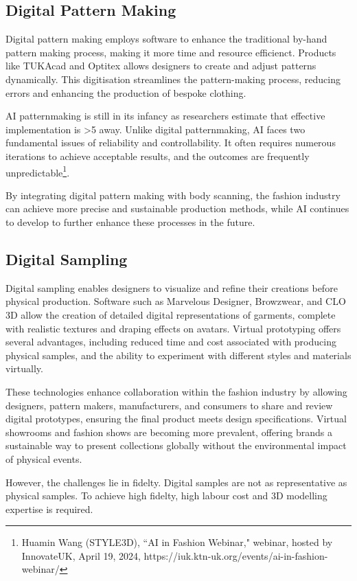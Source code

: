 \subsection{Digital Pattern Making}
Digital pattern making employs software to enhance the traditional by-hand pattern making process, making it more time and resource efficienct. Products like TUKAcad and Optitex allows designers to create and adjust patterns dynamically. This digitisation streamlines the pattern-making process, reducing errors and enhancing the production of bespoke clothing.

AI patternmaking is still in its infancy as researchers estimate that effective implementation is >5 away. Unlike digital patternmaking, AI faces two fundamental issues of reliability and controllability. It often requires numerous iterations to achieve acceptable results, and the outcomes are frequently unpredictable\footnote{Huamin Wang (STYLE3D), ``AI in Fashion Webinar," webinar, hosted by InnovateUK, April 19, 2024, https://iuk.ktn-uk.org/events/ai-in-fashion-webinar/}.

By integrating digital pattern making with body scanning, the fashion industry can achieve more precise and sustainable production methods, while AI continues to develop to further enhance these processes in the future.

\subsection{Digital Sampling}
Digital sampling enables designers to visualize and refine their creations before physical production. Software such as Marvelous Designer, Browzwear, and CLO 3D allow the creation of detailed digital representations of garments, complete with realistic textures and draping effects on avatars. Virtual prototyping offers several advantages, including reduced time and cost associated with producing physical samples, and the ability to experiment with different styles and materials virtually.

These technologies enhance collaboration within the fashion industry by allowing designers, pattern makers, manufacturers, and consumers to share and review digital prototypes, ensuring the final product meets design specifications. Virtual showrooms and fashion shows are becoming more prevalent, offering brands a sustainable way to present collections globally without the environmental impact of physical events.

However, the challenges lie in fidelty. Digital samples are not as representative as physical samples. To achieve high fidelty, high labour cost and 3D modelling expertise is required.


